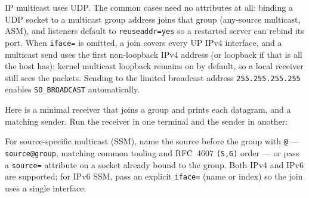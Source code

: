 IP multicast uses UDP. The common cases need no
attributes at all: binding a UDP socket to a multicast group address
joins that group (any-source multicast, ASM), and listeners default to
\texttt{reuseaddr=yes} so a restarted server can rebind its port.
When \texttt{iface=} is omitted, a join covers every UP IPv4
interface, and a multicast send uses the first non-loopback IPv4
address (or loopback if that is all the host has); kernel multicast
loopback remains on by default, so a local receiver still sees the
packets. Sending to the limited broadcast address
\texttt{255.255.255.255} enables \texttt{SO\_BROADCAST} automatically.

Here is a minimal receiver that joins a group and prints each
datagram, and a matching sender. Run the receiver in one terminal and
the sender in another:



For source-specific multicast (SSM), name the source before
the group with \texttt{@} --- \texttt{source@group}, matching common
tooling and RFC~4607 \texttt{(S,G)} order --- or pass a
\texttt{source=} attribute on a socket already bound to the group.
Both IPv4 and IPv6 are supported; for IPv6 SSM, pass an explicit
\texttt{iface=} (name or index) so the join uses a single interface:


